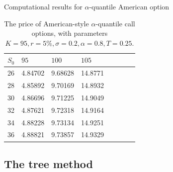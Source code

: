 \documentclass[cjk,10pt]{beamer}
\begin{document}
\begin{frame}{Computational results for $\alpha$-quantile American option}
\begin{table}
\caption{The price of American-style $\alpha$-quantile call options, with parameters
	$K=95, r=5\%, \sigma=0.2, \alpha=0.8, T=0.25$. 
	}
\begin{center}
\begin{tabular}{l|lllllll}
$S_0$ & $95$ & $100$ & $105$        \\
\hline
26 & 4.84702 &  9.68628 & 14.8771\\
28 & 4.85892 &  9.70169 & 14.8932\\
30 & 4.86696 &  9.71225 & 14.9049\\
32 & 4.87621 &  9.72318 & 14.9164\\
34 & 4.88228 &  9.73134 & 14.9251\\
36 & 4.88821 &  9.73857 & 14.9329\\
\end{tabular}
\end{center}
\label{fig:amer8}
\end{table}
\end{frame}

\subsection{The tree method}
\end{document}
